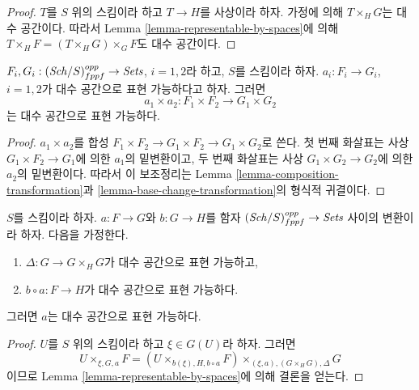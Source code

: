 \begin{proof}
$T$를 $S$ 위의 스킴이라 하고 $T \to H$를 사상이라 하자.
가정에 의해 $T \times_H G$는 대수 공간이다. 따라서
Lemma \ref{lemma-representable-by-spaces}에 의해
$T \times_H F = (T \times_H G) \times_G F$도 대수 공간이다.
\end{proof}

\begin{lemma}
\label{lemma-product-transformations}
$F_i, G_i : (\mathit{Sch}/S)_{fppf}^{opp} \to \textit{Sets}$, $i = 1, 2$라 하고,
$S$를 스킴이라 하자. $a_i : F_i \to G_i$, $i = 1, 2$가
대수 공간으로 표현 가능하다고 하자. 그러면
$$
a_1 \times a_2 : F_1 \times F_2 \longrightarrow G_1 \times G_2
$$
는 대수 공간으로 표현 가능하다.
\end{lemma}

\begin{proof}
$a_1 \times a_2$를 합성
$F_1 \times F_2 \to G_1 \times F_2 \to G_1 \times G_2$로 쓴다.
첫 번째 화살표는 사상 $G_1 \times F_2 \to G_1$에 의한 $a_1$의
밑변환이고, 두 번째 화살표는 사상 $G_1 \times G_2 \to G_2$에 의한
$a_2$의 밑변환이다. 따라서 이 보조정리는 Lemma
\ref{lemma-composition-transformation}과
\ref{lemma-base-change-transformation}의 형식적 귀결이다.
\end{proof}

\begin{lemma}
\label{lemma-representable-by-spaces-permanence}
$S$를 스킴이라 하자. $a : F \to G$와 $b : G \to H$를 함자
$(\mathit{Sch}/S)_{fppf}^{opp} \to \textit{Sets}$ 사이의 변환이라 하자.
다음을 가정한다.
\begin{enumerate}
\item $\Delta : G \to G \times_H G$가 대수 공간으로 표현 가능하고,
\item $b \circ a : F \to H$가 대수 공간으로 표현 가능하다.
\end{enumerate}
그러면 $a$는 대수 공간으로 표현 가능하다.
\end{lemma}

\begin{proof}
$U$를 $S$ 위의 스킴이라 하고 $\xi \in G(U)$라 하자. 그러면
$$
U \times_{\xi, G, a} F =
(U \times_{b(\xi), H, b \circ a} F) \times_{(\xi, a), (G \times_H G), \Delta} G
$$
이므로 Lemma \ref{lemma-representable-by-spaces}에 의해 결론을 얻는다.
\end{proof}

